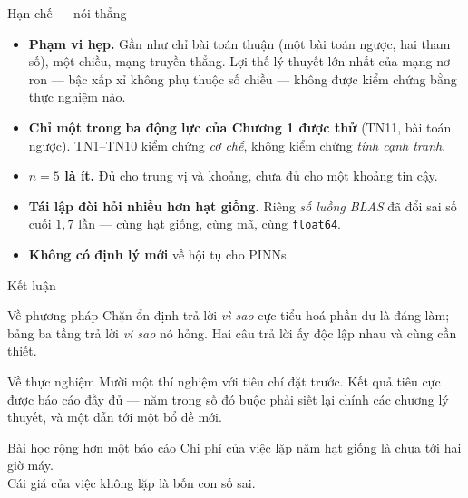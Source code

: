 \documentclass[aspectratio=169,11pt]{beamer}
\begin{document}
\begin{frame}{Hạn chế --- nói thẳng}
\small
\begin{itemize}
\item \textbf{Phạm vi hẹp.} Gần như chỉ bài toán thuận (một bài toán ngược, hai
  tham số), một chiều, mạng truyền thẳng.
  Lợi thế lý thuyết lớn nhất của mạng nơ-ron --- bậc xấp xỉ không phụ thuộc
  số chiều --- \alert{không được kiểm chứng bằng thực nghiệm nào}.

\item \textbf{Chỉ một trong ba động lực của Chương 1 được thử} (TN11, bài toán
  ngược). TN1--TN10 kiểm chứng \emph{cơ chế}, không kiểm chứng
  \emph{tính cạnh tranh}.

\item \textbf{$n = 5$ là ít.} Đủ cho trung vị và khoảng, chưa đủ cho một
  khoảng tin cậy.

\item \textbf{Tái lập đòi hỏi nhiều hơn hạt giống.} Riêng \emph{số luồng BLAS}
  đã đổi sai số cuối $1{,}7$ lần --- cùng hạt giống, cùng mã, cùng
  \texttt{float64}.

\item \textbf{Không có định lý mới} về hội tụ cho PINNs.
\end{itemize}
\end{frame}

\begin{frame}{Kết luận}
\begin{block}{Về phương pháp}
Chặn ổn định trả lời \emph{vì sao} cực tiểu hoá phần dư là đáng làm;
bảng ba tầng trả lời \emph{vì sao} nó hỏng. Hai câu trả lời ấy độc lập nhau
và cùng cần thiết.
\end{block}

\begin{block}{Về thực nghiệm}
Mười một thí nghiệm với tiêu chí đặt trước. Kết quả tiêu cực được báo cáo đầy đủ ---
năm trong số đó buộc phải siết lại chính các chương lý thuyết, và một dẫn tới
một bổ đề mới.
\end{block}

\begin{alertblock}{Bài học rộng hơn một báo cáo}
Chi phí của việc lặp năm hạt giống là chưa tới hai giờ máy.\\
Cái giá của việc không lặp là \alert{bốn con số sai}.
\end{alertblock}
\end{frame}
\end{document}
